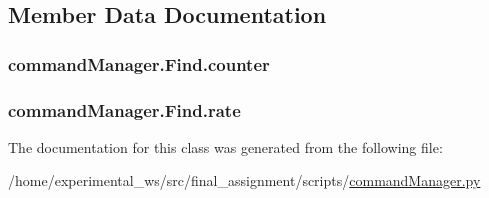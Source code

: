 \subsection{Member Data Documentation}
\subsubsection[{\texorpdfstring{counter}{counter}}]{\setlength{\rightskip}{0pt plus 5cm}command\+Manager.\+Find.\+counter}\hypertarget{classcommandManager_1_1Find_a75755e326232226bbd46786c7c889473}{}\label{classcommandManager_1_1Find_a75755e326232226bbd46786c7c889473}
\subsubsection[{\texorpdfstring{rate}{rate}}]{\setlength{\rightskip}{0pt plus 5cm}command\+Manager.\+Find.\+rate\hspace{0.3cm}{\ttfamily [static]}}\hypertarget{classcommandManager_1_1Find_a9c7870d56b1d25a57af7840fb2967f99}{}\label{classcommandManager_1_1Find_a9c7870d56b1d25a57af7840fb2967f99}


The documentation for this class was generated from the following file\+:\begin{DoxyCompactItemize}
\item 
/home/experimental\+\_\+ws/src/final\+\_\+assignment/scripts/\hyperlink{commandManager_8py}{command\+Manager.\+py}\end{DoxyCompactItemize}
